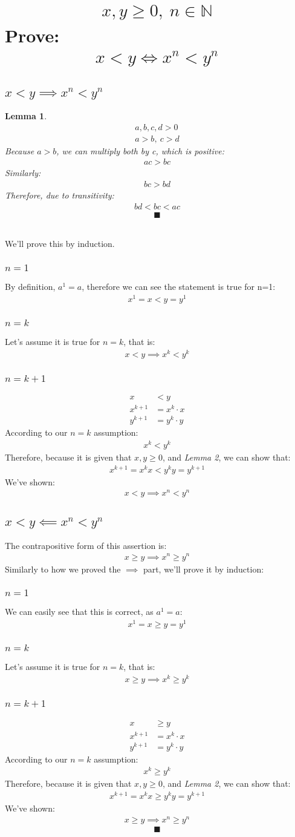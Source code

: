\documentclass[a4paper, 12pt]{article}
\newcommand{\sub}[1]{\subsection{\underline{#1}}}
\newcommand{\subsub}[1]{\subsubsection{\underline{#1}}}
\newcommand{\?}{\stackrel{?}{=}}
\newcommand{\N}{\ensuremath{\mathbb{N}}}
\newcommand{\eq}[1]{\begin{align*}#1\end{align*}}
\renewcommand{\qed}{$$\blacksquare$$}
\newtheorem{lemma}{Lemma}
\begin{document}
\section{\eq{ x,y\geq{0},~n\in{\N}} Prove: \eq{x<y \iff x^n<y^n }}
\sub{$x<y \implies x^n<y^n$}
\begin{lemma}
    \eq{
        a,b,c,d > 0\\
        a>b,~c>d
    }
    Because $a>b$, we can multiply both by c, which is positive:
    \eq{ac>bc}
    Similarly: \eq{bc>bd}
    Therefore, due to transitivity: \eq{bd<bc<ac}
    \qed
\end{lemma}
~\\We'll prove this by induction.
\subsub{$n=1$}
By definition, $a^1=a$, therefore we can see the statement is true for n=1:
\eq{ x^1=x<y=y^1 }
\subsub{$n=k$}
Let's assume it is true for $n=k$, that is:
\eq{x<y \implies x^k<y^k}
\subsub{$n=k+1$}
\eq{
    x&<y\\
    x^{k+1}&=x^k\cdot{x}\\
    y^{k+1}&=y^k\cdot{y}
}
According to our $n=k$ assumption:
\eq{x^k<y^k}
Therefore, because it is given that $x,y\geq{0}$, and \textit{Lemma 2}, we can show that:
\eq{x^{k+1}=x^{k}x<y^{k}y=y^{k+1}}
We've shown: \eq{x<y \implies x^n<y^n}
\sub{$x<y \impliedby x^n<y^n$}
The contrapositive form of this assertion is:
\eq{x\geq{y}\implies{x^n\geq{y^n}}}
Similarly to how we proved the $\implies$ part, we'll prove it by induction:
\subsub{$n=1$}
We can easily see that this is correct, as $a^1=a$: \eq{x^1=x\geq{y}=y^1}
\subsub{$n=k$}
Let's assume it is true for $n=k$, that is:
\eq{x\geq{y} \implies x^k\geq y^k}
\subsub{$n=k+1$}
\eq{
    x&\geq y\\
    x^{k+1}&=x^k\cdot{x}\\
    y^{k+1}&=y^k\cdot{y}
}
According to our $n=k$ assumption:
\eq{x^k\geq{y^k}}
Therefore, because it is given that $x,y\geq{0}$, and \textit{Lemma 2}, we can show that:
\eq{x^{k+1}=x^{k}x\geq y^{k}y=y^{k+1}}
We've shown: \eq{x\geq{y} \implies x^n\geq{y^n}}
\qed

\end{document}
